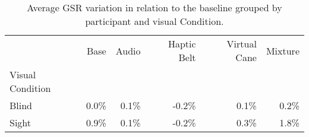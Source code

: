 
\begin{table}[!htb]
\centering
\caption{Average GSR variation in relation to the baseline grouped by participant and visual Condition.}
\label{tab:gsr_table_def}
\begin{tabular}{lrrrrr}
\toprule
{} &   Base &  Audio & Haptic Belt & Virtual Cane & Mixture \\
Visual Condition &        &        &             &              &         \\
\midrule
Blind            &  0.0\% &  0.1\% &      -0.2\% &        0.1\% &   0.2\% \\
Sight            &  0.9\% &  0.1\% &      -0.2\% &        0.3\% &   1.8\% \\
\bottomrule
\end{tabular}
\end{table}

